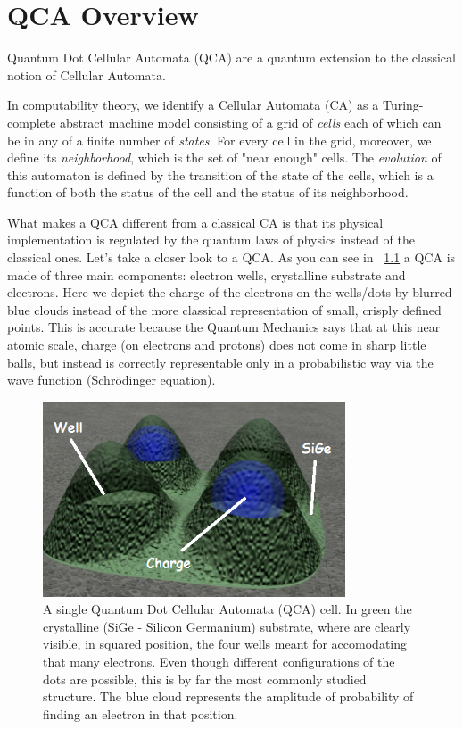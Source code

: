 \chapter{QCA Overview}\label{sec:qca}

Quantum Dot Cellular Automata (QCA) are a quantum extension to the classical notion of Cellular Automata. 

In computability theory, we identify a Cellular Automata (CA) as a Turing-complete abstract machine model consisting of a grid of \textsl{cells} each of which can be in any of a finite number of \textsl{states}. For every cell in the grid, moreover, we define its \textsl{neighborhood}, which is the set of "near enough" cells. The \textsl{evolution} of this automaton is defined by the transition of the state of the cells, which is a function of both the status of the cell and the status of its neighborhood.

What makes a QCA different from a classical CA is that its physical implementation is regulated by the quantum laws of physics instead of the classical ones. Let's take a closer look to a QCA. As you can see in \figurename~\ref{fig:qca} a QCA is made of three main components: electron wells, crystalline substrate and electrons. Here we depict the charge of the electrons on the wells/dots by blurred blue clouds instead of the more classical representation of small, crisply defined points. This is accurate because the Quantum Mechanics says that at this near atomic scale, charge (on electrons and protons) does not come in sharp little balls, but instead is correctly representable only in a probabilistic way via the wave function (Schr\"{o}dinger equation).

\begin{figure}[h!bt]
	\centerline{\includegraphics[width=0.8\textwidth]{img/qca.png}}
	\caption{A single Quantum Dot Cellular Automata (QCA) cell. In green the crystalline (SiGe - Silicon Germanium) substrate, where are clearly visible, in squared position, the four wells meant for accomodating that many electrons. Even though different configurations of the dots are possible, this is by far the most commonly studied structure. The blue cloud represents the amplitude of probability of finding an electron in that position.}
	\label{fig:qca}
\end{figure}

